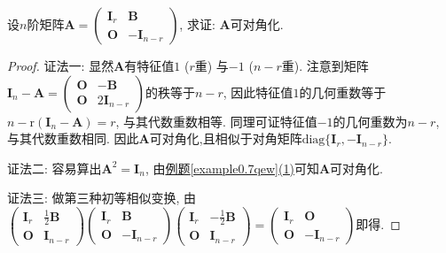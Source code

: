 \documentclass[../../main.tex]{subfiles}%
\begin{document}
\begin{example}
设\(n\)阶矩阵\(\boldsymbol{A} = \begin{pmatrix}
\boldsymbol{I}_r&\boldsymbol{B}\\
\boldsymbol{O}&-\boldsymbol{I}_{n - r}
\end{pmatrix}\), 求证: \(\boldsymbol{A}\)可对角化.
\end{example}
\begin{proof}

{\color{blue}证法一:}
显然\(\boldsymbol{A}\)有特征值\(1\) (\(r\)重) 与\(-1\) (\(n - r\)重). 注意到矩阵\(\boldsymbol{I}_n - \boldsymbol{A} = \begin{pmatrix}
\boldsymbol{O}&-\boldsymbol{B}\\
\boldsymbol{O}&2\boldsymbol{I}_{n - r}
\end{pmatrix}\)的秩等于\(n - r\), 因此特征值\(1\)的几何重数等于\(n - \mathrm{r}(\boldsymbol{I}_n - \boldsymbol{A}) = r\), 与其代数重数相等. 同理可证特征值\(-1\)的几何重数为\(n - r\), 与其代数重数相同. 因此\(\boldsymbol{A}\)可对角化,且相似于对角矩阵\(\mathrm{diag}\{\boldsymbol{I}_r,-\boldsymbol{I}_{n - r}\}\). 

{\color{blue}证法二:}
容易算出\(\boldsymbol{A}^2 = \boldsymbol{I}_n\), 由\hyperref[example0.7qew]{例题\ref{example0.7qew}(1)}可知\(\boldsymbol{A}\)可对角化.

{\color{blue}证法三:}
做第三种初等相似变换,
由\(\begin{pmatrix}
\boldsymbol{I}_r&\frac{1}{2}\boldsymbol{B}\\
\boldsymbol{O}&\boldsymbol{I}_{n - r}
\end{pmatrix}
\begin{pmatrix}
\boldsymbol{I}_r&\boldsymbol{B}\\
\boldsymbol{O}&-\boldsymbol{I}_{n - r}
\end{pmatrix}
\begin{pmatrix}
\boldsymbol{I}_r&-\frac{1}{2}\boldsymbol{B}\\
\boldsymbol{O}&\boldsymbol{I}_{n - r}
\end{pmatrix}
=
\begin{pmatrix}
\boldsymbol{I}_r&\boldsymbol{O}\\
\boldsymbol{O}&-\boldsymbol{I}_{n - r}
\end{pmatrix}\)即得. 

\end{proof}
\end{document}
